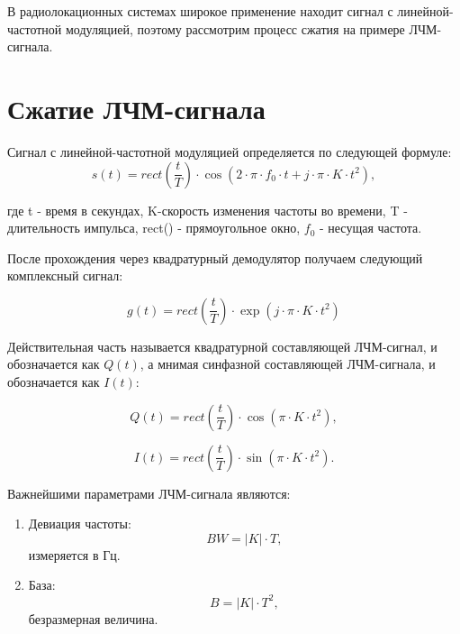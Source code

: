 В радиолокационных системах широкое применение находит сигнал с линейной-частотной модуляцией, поэтому рассмотрим процесс сжатия на примере ЛЧМ-сигнала.

\section{Сжатие ЛЧМ-сигнала}

Сигнал с линейной-частотной модуляцией определяется по следующей формуле:
\begin{equation}	
	s(t) = rect(\frac{t}{T}) \cdot \cos(2 \cdot \pi \cdot f_0 \cdot t + j \cdot \pi \cdot K \cdot t^{2}),
\end{equation}

где t - время в секундах, K-скорость изменения частоты во времени, T - длительность импульса, rect() - прямоугольное окно, \(f_0\) - несущая частота.

После прохождения через квадратурный демодулятор получаем следующий комплексный сигнал:

\begin{equation}	
	g(t) = rect(\frac{t}{T}) \cdot \exp(j \cdot \pi \cdot K \cdot t^{2})
\end{equation}

Действительная часть называется квадратурной
составляющей ЛЧМ-сигнал, и обозначается как \(Q(t)\), а мнимая 
синфазной составляющей ЛЧМ-сигнала, и обозначается как \(I(t)\):

\begin{equation}	
	Q(t) = rect(\frac{t}{T}) \cdot \cos(\pi \cdot K \cdot t^{2}),
\end{equation}

\begin{equation}	
	I(t) = rect(\frac{t}{T}) \cdot \sin(\pi \cdot K \cdot t^{2}).
\end{equation}

Важнейшими параметрами ЛЧМ-сигнала являются:

\begin{enumerate}
	\item Девиация частоты: 
\begin{equation}
	BW = |K| \cdot T, 
\end{equation}
измеряется в Гц.
	\item База: 
\begin{equation}
	B = |K| \cdot T^2, 
\end{equation}
безразмерная величина.
\end{enumerate}

